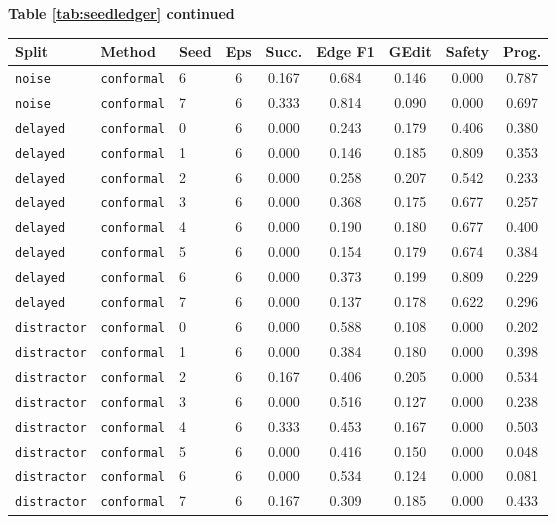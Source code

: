\documentclass{article}
\begin{document}
\begin{center}
\textbf{Table \ref{tab:seedledger} continued}\\[0.4ex]
\begin{tabular}{lllcccccc}
\toprule
Split & Method & Seed & Eps & Succ. & Edge F1 & GEdit & Safety & Prog. \\
\midrule
\texttt{noise} & \texttt{conformal} & 6 & 6 & 0.167 & 0.684 & 0.146 & 0.000 & 0.787 \\
\texttt{noise} & \texttt{conformal} & 7 & 6 & 0.333 & 0.814 & 0.090 & 0.000 & 0.697 \\
\texttt{delayed} & \texttt{conformal} & 0 & 6 & 0.000 & 0.243 & 0.179 & 0.406 & 0.380 \\
\texttt{delayed} & \texttt{conformal} & 1 & 6 & 0.000 & 0.146 & 0.185 & 0.809 & 0.353 \\
\texttt{delayed} & \texttt{conformal} & 2 & 6 & 0.000 & 0.258 & 0.207 & 0.542 & 0.233 \\
\texttt{delayed} & \texttt{conformal} & 3 & 6 & 0.000 & 0.368 & 0.175 & 0.677 & 0.257 \\
\texttt{delayed} & \texttt{conformal} & 4 & 6 & 0.000 & 0.190 & 0.180 & 0.677 & 0.400 \\
\texttt{delayed} & \texttt{conformal} & 5 & 6 & 0.000 & 0.154 & 0.179 & 0.674 & 0.384 \\
\texttt{delayed} & \texttt{conformal} & 6 & 6 & 0.000 & 0.373 & 0.199 & 0.809 & 0.229 \\
\texttt{delayed} & \texttt{conformal} & 7 & 6 & 0.000 & 0.137 & 0.178 & 0.622 & 0.296 \\
\texttt{distractor} & \texttt{conformal} & 0 & 6 & 0.000 & 0.588 & 0.108 & 0.000 & 0.202 \\
\texttt{distractor} & \texttt{conformal} & 1 & 6 & 0.000 & 0.384 & 0.180 & 0.000 & 0.398 \\
\texttt{distractor} & \texttt{conformal} & 2 & 6 & 0.167 & 0.406 & 0.205 & 0.000 & 0.534 \\
\texttt{distractor} & \texttt{conformal} & 3 & 6 & 0.000 & 0.516 & 0.127 & 0.000 & 0.238 \\
\texttt{distractor} & \texttt{conformal} & 4 & 6 & 0.333 & 0.453 & 0.167 & 0.000 & 0.503 \\
\texttt{distractor} & \texttt{conformal} & 5 & 6 & 0.000 & 0.416 & 0.150 & 0.000 & 0.048 \\
\texttt{distractor} & \texttt{conformal} & 6 & 6 & 0.000 & 0.534 & 0.124 & 0.000 & 0.081 \\
\texttt{distractor} & \texttt{conformal} & 7 & 6 & 0.167 & 0.309 & 0.185 & 0.000 & 0.433 \\

\end{tabular}
\end{center}
\end{document}
